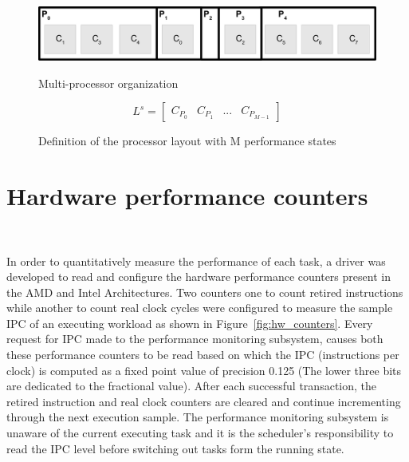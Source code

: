 \begin{figure}[h!]
  \begin{center}
    \includegraphics[height=1in]{figures/Processor_Organization.jpg}%
    \caption{Multi-processor organization}
    \label{fig:processor_groups}
  \end{center}
\end{figure}

\begin{figure}[h!]
\centering
\begin{equation*}
   L^{s} = \left[
     \begin{array}{lccr}
       C_{P_{0}} & C_{P_{1}} & ... & C_{P_{M-1}}
     \end{array} \right]
\end{equation*}
\caption{Definition of the processor layout with M performance states}
\label{fig:layout_scheduler}
\end{figure}


\section{Hardware performance counters}~\label{sec:perf_counters}

In order to quantitatively measure the performance of each task, 
a driver was developed to read and configure the hardware performance counters
present in the AMD and Intel Architectures. Two counters one to count retired instructions
while another to count real clock cycles were configured to measure the sample IPC 
of an executing workload as shown in Figure~\ref{fig:hw_counters}. Every
request for IPC made to the performance monitoring subsystem,
causes both these performance counters to be read based on which the IPC (instructions per clock) is computed 
as a fixed point value of precision 0.125 (The lower three bits are dedicated to the fractional value).
After each successful transaction, the retired instruction and real clock counters are cleared and 
continue incrementing through the next execution sample.
The performance monitoring subsystem is unaware of the current executing task and it is the scheduler's
responsibility to read the IPC level before switching out tasks form the running state. 

